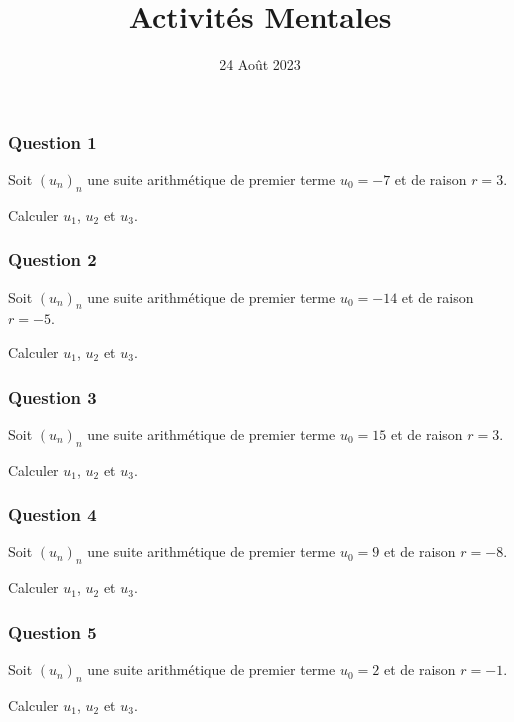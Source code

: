 \documentclass[15pt, mathserif]{beamer}
\title{Activités Mentales}
\date{24 Août 2023}
\begin{document}
\begin{frame}
    \titlepage
\end{frame}

\begin{frame} 
	\frametitle{Question 1}
Soit $(u_n)_n$ une suite arithmétique de premier terme $u_0=-7$ et de raison $r=3$. 
 
 Calculer $u_1$, $u_2$ et $u_3$.\end{frame}


\begin{frame} 
	\frametitle{Question 2}
Soit $(u_n)_n$ une suite arithmétique de premier terme $u_0=-14$ et de raison $r=-5$. 
 
 Calculer $u_1$, $u_2$ et $u_3$.\end{frame}


\begin{frame} 
	\frametitle{Question 3}
Soit $(u_n)_n$ une suite arithmétique de premier terme $u_0=15$ et de raison $r=3$. 
 
 Calculer $u_1$, $u_2$ et $u_3$.\end{frame}


\begin{frame} 
	\frametitle{Question 4}
Soit $(u_n)_n$ une suite arithmétique de premier terme $u_0=9$ et de raison $r=-8$. 
 
 Calculer $u_1$, $u_2$ et $u_3$.\end{frame}


\begin{frame} 
	\frametitle{Question 5}
Soit $(u_n)_n$ une suite arithmétique de premier terme $u_0=2$ et de raison $r=-1$. 
 
 Calculer $u_1$, $u_2$ et $u_3$.\end{frame}
\end{document}
